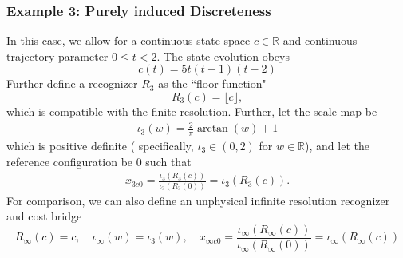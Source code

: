 \documentclass[11pt,a4paper]{article}
\begin{document}
\subsubsection{Example 3: Purely induced Discreteness}
In this case, we allow for a continuous state space $c\in\mathbb{R}$ and continuous trajectory parameter $0\le t<2$. The state evolution obeys
\begin{equation}
    c(t)=5t(t-1)(t-2)
    \label{stateevolutionexample3}
\end{equation}
Further define a recognizer $R_3$ as the ``floor function"
\begin{equation}
    R_3(c)=\lfloor c\rfloor,
\end{equation}
which is compatible with the finite resolution. Further, let the scale map be
\begin{align}
    \iota_3(w)=\frac{2}{\pi}\arctan(w)+1 \label{iota3}
\end{align}
which is positive definite ( specifically, $\iota_3\in(0,2)$ for $w\in \mathbb{R}$), and let the reference configuration be $0$ such that 
\begin{align}
    x_{3 c0}=\frac{\iota_3(R_3(c))}{\iota_3(R_3(0))}=\iota_3(R_3(c)). 
\end{align}
For comparison, we can also define an unphysical infinite resolution recognizer and cost bridge
\begin{equation}
    R_\infty(c)=c,\quad\iota_\infty(w)=\iota_3(w), \quad x_{\infty c0}=\frac{\iota_\infty(R_\infty(c))}{\iota_\infty(R_\infty(0))}=\iota_\infty(R_\infty(c)) \label{Rinf}
\end{equation}
\end{document}
